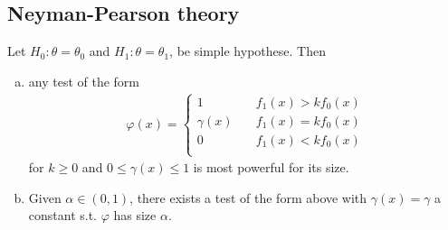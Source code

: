 \subsection{Neyman-Pearson theory}
{\color{blue} \begin{thm}
	Let $H_0: \theta = \theta_0$ and $H_1: \theta = \theta_1$, be simple hypothese. Then
	\begin{enumerate}[a)]
		\item any test of the form 
		\begin{align}
			\varphi(x) = \begin{cases}
			1 &\quad f_1(x)>k f_0(x) \\
			\gamma(x) &\quad f_1(x)=k f_0(x) \\
			0 &\quad f_1(x)<k f_0(x) \\
			\end{cases}
		\end{align}
		for $k\geq 0$ and $0\leq \gamma(x) \leq 1$ is most powerful for its size.
		
		\item Given $\alpha\in (0,1)$, there exists a test of the form above with $\gamma(x) = \gamma$ a constant s.t. $\varphi$ has size $\alpha$.
	\end{enumerate}
\end{thm}}
